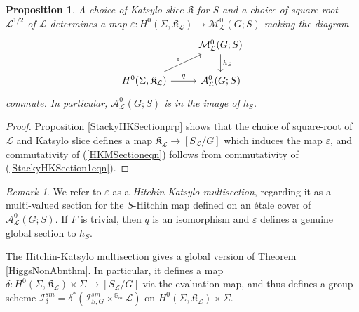 \documentclass{amsart}
\newtheorem{proposition}[theorem]{Proposition}
\theoremstyle{remark}
\newtheorem{remark}[theorem]{Remark}
\numberwithin{theorem}{section}
\numberwithin{equation}{section}
\begin{document}
\begin{proposition}\label{HKMSectionprp}
     A choice of Katsylo slice $\mathfrak{K}$ for $S$ and a choice of square root $\mathcal L^{1/2}$ of $\mathcal L$ determines a map $\varepsilon: H^0(\Sigma,\mathfrak{K}_\mathcal L) \rightarrow \mathcal M_\mathcal L^0(G;S)$ making the diagram
\begin{equation} \label{HKMSectioneqn}    
\begin{tikzcd}
                   & \mathcal M^0_\mathcal L(G;S) \arrow[d, "h_S"] \\
{H^0(\Sigma,\mathfrak{K}_\mathcal L)} \arrow[r, "q"] \arrow[ru, "\varepsilon"] & \mathcal A^0_\mathcal L(G;S)                 
\end{tikzcd}
\end{equation}
     commute. In particular, $\mathcal A_{\mathcal L}^0(G;S)$ is in the image of $h_S$.
\end{proposition}

\begin{proof} 
Proposition \ref{StackyHKSectionprp} shows that the choice of square-root of $\mathcal L$ and Katsylo slice defines a map $\mathfrak{K}_\mathcal L \rightarrow [S_{\mathcal L}/G]$ which induces the map $\varepsilon$, and commutativity of (\ref{HKMSectioneqn}) follows from commutativity of (\ref{StackyHKSection1eqn}).
\end{proof}

\begin{remark}\label{HKMSectionrmk}
    We refer to $\varepsilon$ as a \emph{Hitchin-Katsylo multisection}, regarding it as a multi-valued section for the $S$-Hitchin map defined on an étale cover of $\mathcal A_\mathcal L^0(G;S)$. If $F$ is trivial, then $q$ is an isomorphism and $\varepsilon$ defines a genuine global section to $h_S$.
\end{remark}

The Hitchin-Katsylo multisection gives a global version of Theorem \ref{HiggsNonAbnthm}. In particular, it defines a map $\delta: H^0(\Sigma,\mathfrak{K}_\mathcal L) \times \Sigma \rightarrow [S_{\mathcal L}/G]$ via the evaluation map, and thus defines a group scheme $\mathcal I_{\delta}^{sm} = \delta^*(\mathcal I^{sm}_{S,G} \times^{\mathbb{G}_m}\mathcal L)$ on $H^0(\Sigma,\mathfrak{K}_\mathcal L) \times \Sigma$.
\end{document}
